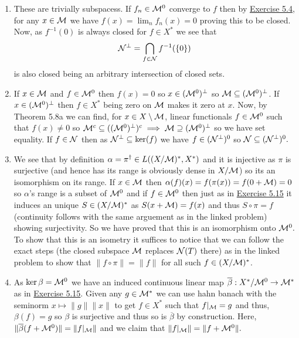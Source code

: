 \documentclass[12pt,a4paper]{article}
\begin{document}
\begin{solution}
    \begin{enumerate}[label=\alph*.]
        \item These are trivially subspacess. 
            If $f_n\in\mathcal{M}^0$ converge to $f$ then by \hyperref[prob:5-4]{Exercise 5.4}, for any $x\in\mathcal{M}$ we have $f(x)=\lim_nf_n(x)=0$ proving this to be closed. 
            Now, as $f^{-1}( \qty{0})$ is always closed for $f\in X^*$ we see that
            \[
                \mathcal{N}^\perp=\bigcap_{f\in\mathcal{N}}f^{-1}( \qty{0})
            \]
            is also closed being an arbitrary intersection of closed sets. 
        \item If $x\in\mathcal{M}$ and $f\in\mathcal{M}^0$ then $f(x)=0$ so $x\in(\mathcal{M}^0)^\perp$ so $\mathcal{M} \subseteq(\mathcal{M}^0)^\perp$. 
            If $x\in(\mathcal{M}^0)^\perp$ then $f\in X^*$ being zero on $\mathcal{M}$ makes it zero at $x.$ 
            Now, by Theorem 5.8a we can find, for $x\in X\setminus\mathcal{M}$, linear functionals $f\in\mathcal{M}^0$ such that $f(x)\neq 0$ so $\mathcal{M}^c \subseteq((\mathcal{M}^0)^\perp)^c\implies\mathcal{M} \supseteq(\mathcal{M}^0)^\perp$ so we have set equality. 
            If $f\in\mathcal{N}$ then as $\mathcal{N}^\perp \subseteq\ker(f)$ we have $f\in(\mathcal{N}^\perp)^0$ so $\mathcal{N} \subseteq(\mathcal{N}^\perp)^0.$ 
        \item We see that by definition $\alpha=\pi^\dagger\in L((X/\mathcal{M})^*,X^*)$ and it is injective as $\pi$ is surjective (and hence has its range is obviously dense in $X/\mathcal{M}$) so its an isomorphism on its range. 
            If $x\in\mathcal{M}$ then $\alpha(f)(x)=f(\pi(x))=f(0+\mathcal{M})=0$ so $\alpha$'s range is a subset of $\mathcal{M}^0$ and if $f\in\mathcal{M}^0$ then just as in \hyperref[prob:5-15]{Exercise 5.15} it induces an unique $S\in(X/\mathcal{M})^*$ as $S(x+\mathcal{M})=f(x)$ and thus $S\circ\pi=f$ (continuity follows with the same arguement as in the linked problem) showing surjectivity. 
            So we have proved that this is an isomorphism onto $\mathcal{M}^0.$ 
            To show that this is an isometry it suffices to notice that we can follow the exact steps (the closed subspace $\mathcal{M}$ replaces  $\mathcal{N}(T)$ there) as in the linked problem to show that $\|f\circ\pi\|=\|f\|$ for all such $f\in(X/\mathcal{M})^*$. 
        \item As $\ker\beta=\mathcal{M}^0$ we have an induced continuous linear map $ \overline{\beta}:X^*/\mathcal{M}^0\to\mathcal{M}^*$ as in \hyperref[prob:5-15]{Exercise 5.15}. 
            Given any $g\in\mathcal{M}^*$ we can use hahn banach with the seminorm $x\mapsto\|g\|\|x\|$ to get $f\in X^*$ such that $f|_{\mathcal{M}}=g$ and thus, $\beta(f)=g$ so $\beta$ is surjective and thus so is $ \overline{\beta}$ by construction. 
            Here, $\| \overline{\beta}(f+\mathcal{M}^0)\|=\|f|_{\mathcal{M}}\|$ and we claim that $\|f|_{\mathcal{M}}\|=\|f+\mathcal{M}^0\|.$ 

\end{enumerate}
\end{solution}
\end{document}
